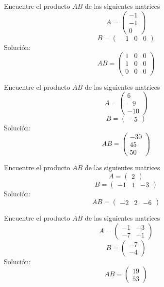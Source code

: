 \begin{problema}
	Encuentre el producto $AB$ de las siguientes matrices
	$$A= \left(\begin{array}{r}
		-1 \\
		-1 \\
		0
	\end{array}\right) $$
	$$B= \left(\begin{array}{rrr}
		-1 & 0 & 0
	\end{array}\right) $$
	Solución:
	$$AB= \left(\begin{array}{rrr}
		1 & 0 & 0 \\
		1 & 0 & 0 \\
		0 & 0 & 0
	\end{array}\right) $$
\end{problema}



\begin{problema}
	Encuentre el producto $AB$ de las siguientes matrices
	$$A= \left(\begin{array}{r}
		6 \\
		-9 \\
		-10
	\end{array}\right) $$
	$$B= \left(\begin{array}{r}
		-5
	\end{array}\right) $$
	Solución:
	$$AB= \left(\begin{array}{r}
		-30 \\
		45 \\
		50
	\end{array}\right) $$
\end{problema}



\begin{problema}
	Encuentre el producto $AB$ de las siguientes matrices
	$$A= \left(\begin{array}{r}
		2
	\end{array}\right) $$
	$$B= \left(\begin{array}{rrr}
		-1 & 1 & -3
	\end{array}\right) $$
	Solución:
	$$AB= \left(\begin{array}{rrr}
		-2 & 2 & -6
	\end{array}\right) $$
\end{problema}



\begin{problema}
	Encuentre el producto $AB$ de las siguientes matrices
	$$A= \left(\begin{array}{rr}
		-1 & -3 \\
		-7 & -1
	\end{array}\right) $$
	$$B= \left(\begin{array}{r}
		-7 \\
		-4
	\end{array}\right) $$
	Solución:
	$$AB= \left(\begin{array}{r}
		19 \\
		53
	\end{array}\right) $$
\end{problema}



